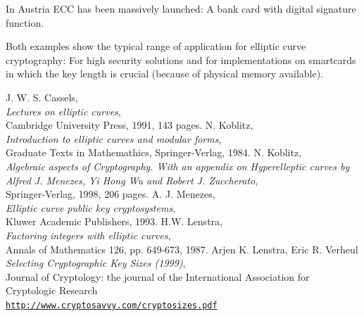 In Austria ECC has been massively launched: A bank card with digital signature function.

Both examples show the typical range of application for elliptic curve cryptography: For high security solutions and for implementations on smartcards in which the key length is crucial (because of physical memory available).




\newpage
\begin{thebibliography}{99999}

     J. W. S. Cassels,
	 \\
        {\em Lectures on elliptic curves},\\
	Cambridge University Press, 1991, 143 pages.
    N. Koblitz, 
	 \\
        {\em Introduction to elliptic curves and modular forms},\\
	Graduate Texts in Mathemathics, Springer-Verlag, 1984.
    N. Koblitz,  
	\\
	{\em Algebraic aspects of Cryptography. With an appendix on 
	Hyperelleptic curves by Alfred J. Menezes, Yi Hong Wu and Robert 
	J. Zuccherato}, \\
	Springer-Verlag, 1998, 206 pages.
    A. J. Menezes, 
	 \\
        {\em Elliptic curve public key cryptosystems},\\
	Kluwer Academic Publishers, 1993.
     H.W. Lenstra, 
         \\
        {\em Factoring integers with elliptic curves}, \\
	Annals of Mathematics 126, pp. 649-673, 1987.
     Arjen K. Lenstra, Eric R. Verheul
         \\
        {\em Selecting Cryptographic Key Sizes (1999)},\\
	Journal of Cryptology: the journal of the International 
	Association for Cryptologic Research \\
	\href{http://www.cryptosavvy.com/cryptosizes.pdf}
	{\texttt{http://www.cryptosavvy.com/cryptosizes.pdf}}

\end{thebibliography}
